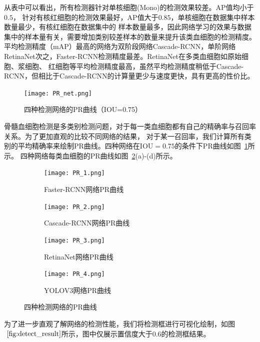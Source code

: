 从表中可以看出，所有检测器针对单核细胞(Mono)的检测效果较差。$\text{AP}$值均小于$0.5$，
针对有核红细胞的检测效果最好，$\text{AP}$值大于$0.85$，单核细胞在数据集中样本数量最少，有核红细胞在数据集中的
样本数量最多，因此网络学习的效果与数据集中的样本量有关，需要增加类别较差样本的数量来提升该类血细胞的检测精度。
平均检测精度（mAP）最高的网络为双阶段网络Cascade-RCNN，单阶网络RetinaNet次之，Faster-RCNN检测精度最差。RetinaNet在多类血细胞如原始细胞、浆细胞、
红细胞等平均检测精度最高，虽然平均检测精度稍低于Cascade-RCNN，但相比于Cascade-RCNN的计算量更少与速度更快，具有更高的性价比。

\begin{figure}[htbp]                     
  \centering                      
  \texttt{[image: PR\_net.png]}                      
  \caption{四种检测网络的PR曲线（IOU=0.75）}                      
  \label{fig:pr_net}       
\end{figure}   

骨髓血细胞检测是多类别检测问题，对于每一类血细胞都有自己的精确率与召回率关系。为了更加直观的比较不同网络的结果，
对于某一召回率，我们计算所有类别的平均精确率来绘制PR曲线。四种网络在$\text{IOU}=0.75$的条件下PR曲线如图~\ref{fig:pr_net}所示。
四种网络每类血细胞的PR曲线如图~\ref{fig:pr_curve}(a)-(d)所示。

\begin{figure}[htbp]
	\centering
  \begin{subfigure}{0.48\linewidth}
    \centering
    \texttt{[image: PR\_1.png]}
    \caption{Faster-RCNN网络PR曲线}
  \end{subfigure}
  \begin{subfigure}{0.48\linewidth}
    \centering
    \texttt{[image: PR\_2.png]}
    \caption{Cascade-RCNN网络PR曲线}
  \end{subfigure}
	\centering
  \begin{subfigure}{0.48\linewidth}
    \centering
    \texttt{[image: PR\_3.png]}
    \caption{RetinaNet网络PR曲线}
  \end{subfigure}
  \centering
  \begin{subfigure}{0.48\linewidth}
    \centering
    \texttt{[image: PR\_4.png]}
    \caption{YOLOV3网络PR曲线}
  \end{subfigure}
	\caption{四种检测网络的PR曲线}
	\label{fig:pr_curve}
\end{figure}

为了进一步直观了解网络的检测性能，我们将检测框进行可视化绘制，如图$~\ref{fig:detect_result}$所示，图中仅展示置信度大于0.6的检测框结果。

